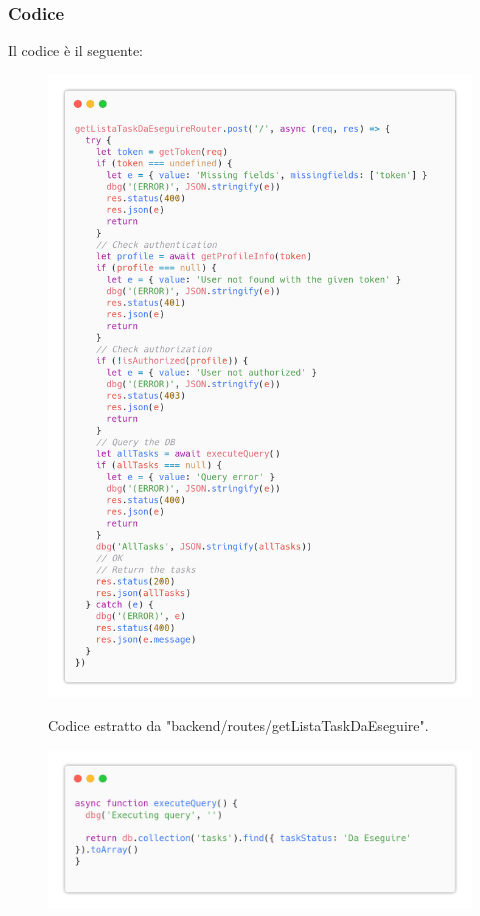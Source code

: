\documentclass{report}
\begin{document}
\subsubsection*{Codice}

Il codice è il seguente:
\begin{figure}[H]
	\centering\includegraphics[width=1\textwidth]{images/code_da_eseguire.png}
	
	Codice estratto da "backend/routes/getListaTaskDaEseguire".
\end{figure}
\begin{figure}[H]
	\centering\includegraphics[width=1\textwidth]{images/code_da_eseguire2.png}
\end{figure}
\end{document}
